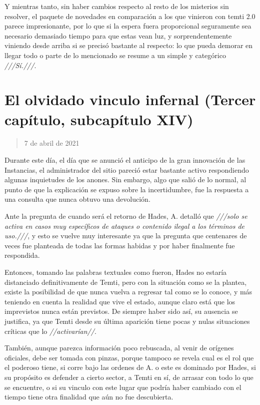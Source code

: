 \documentclass[
  spanish,
]{book}
\begin{document}
Y mientras tanto, sin haber cambios respecto al resto de los misterios sin resolver, el paquete de novedades en comparación a los que vinieron con temti 2.0 parece impresionante, por lo que si la espera fuera proporcional seguramente sea necesario demasiado tiempo para que estas vean luz, y sorprendentemente viniendo desde arriba si se precisó bastante al respecto: lo que pueda demorar en llegar todo o parte de lo mencionado se resume a un simple y categórico \emph{///Sí.///}.

\hypertarget{el-olvidado-vinculo-infernal-tercer-capuxedtulo-subcapuxedtulo-xiv}{%
\section{El olvidado vinculo infernal (Tercer capítulo, subcapítulo XIV)}\label{el-olvidado-vinculo-infernal-tercer-capuxedtulo-subcapuxedtulo-xiv}}

\begin{quote}
7 de abril de 2021
\end{quote}

Durante este día, el día que se anunció el anticipo de la gran innovación de las Instancias, el administrador del sitio pareció estar bastante activo respondiendo algunas inquietudes de los anones. Sin embargo, algo que salió de lo normal, al punto de que la explicación se expuso sobre la incertidumbre, fue la respuesta a una consulta que nunca obtuvo una devolución.

Ante la pregunta de cuando será el retorno de Hades, A. detalló que \emph{///solo se activa en casos muy específicos de ataques o contenido ilegal a los términos de uso.///}, y esto se vuelve muy interesante ya que la pregunta que centenares de veces fue planteada de todas las formas habidas y por haber finalmente fue respondida.

Entonces, tomando las palabras textuales como fueron, Hades no estaría distanciado definitivamente de Temti, pero con la situación como se la plantea, existe la posibilidad de que nunca vuelva a regresar tal como se lo conoce, y más teniendo en cuenta la realidad que vive el estado, aunque claro está que los imprevistos nunca están previstos. De siempre haber sido así, su ausencia se justifica, ya que Temti desde su última aparición tiene pocas y nulas situaciones críticas que lo \emph{//activarían//}.

También, aunque parezca información poco rebuscada, al venir de orígenes oficiales, debe ser tomada con pinzas, porque tampoco se revela cual es el rol que el poderoso tiene, si corre bajo las ordenes de A. o este es dominado por Hades, si su propósito es defender a cierto sector, a Temti en sí, de arrasar con todo lo que se encuentre, o si su vinculo con este lugar que podría haber cambiado con el tiempo tiene otra finalidad que aún no fue descubierta.
\end{document}
